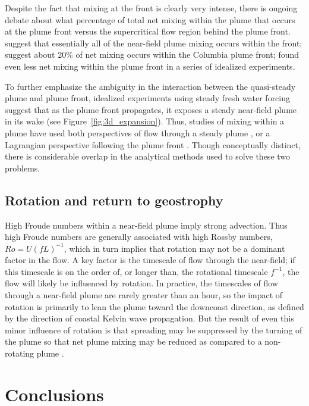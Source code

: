 \documentclass[12pt]{article}
\begin{document}
Despite the fact that mixing at the front is clearly very intense, there is ongoing debate about what percentage of total net mixing within the plume that occurs at the plume front versus the supercritical flow region behind the plume front. \citet{pritchard.huntley:06} suggest that essentially all of the near-field plume mixing occurs within the front; \citet{orton.jay:05} suggest about 20\% of net mixing occurs within the Columbia plume front; \citet{cole:14} found even less net mixing within the plume front in a series of idealized experiments.

To further emphasize the ambiguity in the interaction between the quasi-steady plume and plume front, idealized experiments using steady fresh water forcing suggest that as the plume front propagates, it exposes a steady near-field plume in its wake (see Figure~\ref{fig:3d_expansion}). Thus, studies of mixing within a plume have used both perspectives of flow through a steady plume \citep{hetland:10a}, or a Lagrangian perspective following the plume front \citep{jay.ea:00}. Though conceptually distinct, there is considerable overlap in the analytical methods used to solve these two problems.


\subsection{Rotation and return to geostrophy}

High Froude numbers within a near-field plume imply strong advection. Thus high Froude numbers are generally associated with high Rossby numbers, $Ro = U (f L)^{-1}$, which in turn implies that rotation may not be a dominant factor in the flow. A key factor is the timescale of flow through the near-field; if this timescale is on the order of, or longer than, the rotational timescale $f^{-1}$, the flow will likely be influenced by rotation. In practice, the timescales of flow through a near-field plume are rarely greater than an hour, so the impact of rotation is primarily to lean the plume toward the downcoast direction, as defined by the direction of coastal Kelvin wave propagation. But the result of even this minor influence of rotation is that spreading may be suppressed by the turning of the plume so that net plume mixing may be reduced as compared to a non-rotating plume \citep{cole.hetland:16}.

\section{Conclusions}
\end{document}
